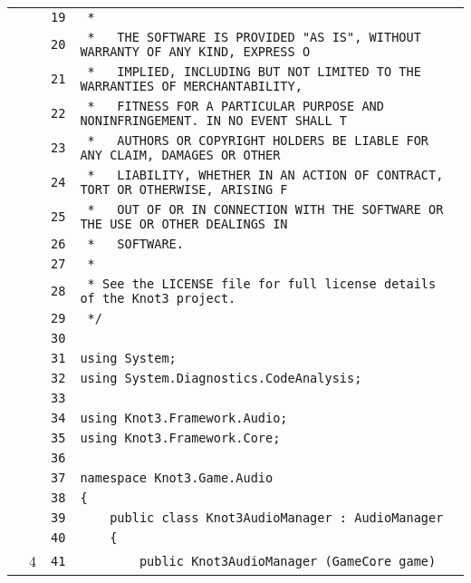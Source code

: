 \documentclass[a4paper,10pt]{article}
\begin{document}
\begin{longtable}[l]{lrrl}
\cellcolor{gray} &  & \verb~19~ & \verb~ *~\\
\cellcolor{gray} &  & \verb~20~ & \verb~ *   THE SOFTWARE IS PROVIDED "AS IS", WITHOUT WARRANTY OF ANY KIND, EXPRESS O~\\
\cellcolor{gray} &  & \verb~21~ & \verb~ *   IMPLIED, INCLUDING BUT NOT LIMITED TO THE WARRANTIES OF MERCHANTABILITY,~\\
\cellcolor{gray} &  & \verb~22~ & \verb~ *   FITNESS FOR A PARTICULAR PURPOSE AND NONINFRINGEMENT. IN NO EVENT SHALL T~\\
\cellcolor{gray} &  & \verb~23~ & \verb~ *   AUTHORS OR COPYRIGHT HOLDERS BE LIABLE FOR ANY CLAIM, DAMAGES OR OTHER~\\
\cellcolor{gray} &  & \verb~24~ & \verb~ *   LIABILITY, WHETHER IN AN ACTION OF CONTRACT, TORT OR OTHERWISE, ARISING F~\\
\cellcolor{gray} &  & \verb~25~ & \verb~ *   OUT OF OR IN CONNECTION WITH THE SOFTWARE OR THE USE OR OTHER DEALINGS IN~\\
\cellcolor{gray} &  & \verb~26~ & \verb~ *   SOFTWARE.~\\
\cellcolor{gray} &  & \verb~27~ & \verb~ *~\\
\cellcolor{gray} &  & \verb~28~ & \verb~ * See the LICENSE file for full license details of the Knot3 project.~\\
\cellcolor{gray} &  & \verb~29~ & \verb~ */~\\
\cellcolor{gray} &  & \verb~30~ & \verb~~\\
\cellcolor{gray} &  & \verb~31~ & \verb~using System;~\\
\cellcolor{gray} &  & \verb~32~ & \verb~using System.Diagnostics.CodeAnalysis;~\\
\cellcolor{gray} &  & \verb~33~ & \verb~~\\
\cellcolor{gray} &  & \verb~34~ & \verb~using Knot3.Framework.Audio;~\\
\cellcolor{gray} &  & \verb~35~ & \verb~using Knot3.Framework.Core;~\\
\cellcolor{gray} &  & \verb~36~ & \verb~~\\
\cellcolor{gray} &  & \verb~37~ & \verb~namespace Knot3.Game.Audio~\\
\cellcolor{gray} &  & \verb~38~ & \verb~{~\\
\cellcolor{gray} &  & \verb~39~ & \verb~    public class Knot3AudioManager : AudioManager~\\
\cellcolor{gray} &  & \verb~40~ & \verb~    {~\\
\cellcolor{green} & 4 & \verb~41~ & \verb~        public Knot3AudioManager (GameCore game)~\\

\end{longtable}
\end{document}
